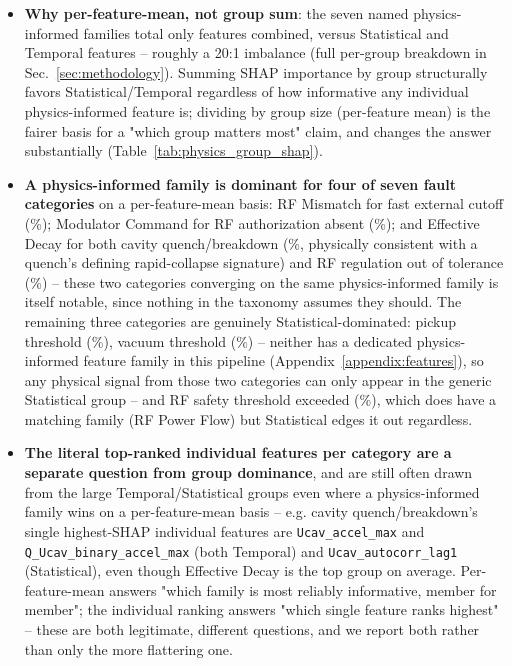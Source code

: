 \begin{itemize}
    \item \textbf{Why per-feature-mean, not group sum}: the seven named physics-informed families total only \MetricOneZeroPhysicsGroupShapNFeaturesPhysicsInformedTotal{} features combined, versus \MetricOneZeroPhysicsGroupShapNFeaturesStatistical{} Statistical and \MetricOneZeroPhysicsGroupShapNFeaturesTemporal{} Temporal features -- roughly a 20:1 imbalance (full per-group breakdown in Sec.~\ref{sec:methodology}). %
Summing SHAP importance by group structurally favors Statistical/Temporal regardless of how informative any individual physics-informed feature is; dividing by group size (per-feature mean) is the fairer basis for a "which group matters most" claim, and changes the answer substantially (Table~\ref{tab:physics_group_shap}).
    \item \textbf{A physics-informed family is dominant for four of seven fault categories} on a per-feature-mean basis: RF Mismatch for fast external cutoff (\MetricOneZeroPhysicsGroupShapFastExternalCutoffTopGroupMeanPct\%); Modulator Command for RF authorization absent (\MetricOneZeroPhysicsGroupShapRfAuthorizationAbsentTopGroupMeanPct\%); and Effective Decay for both cavity quench/breakdown (\MetricOneZeroPhysicsGroupShapCavityQuenchBreakdownTopGroupMeanPct\%, physically consistent with a quench's defining rapid-collapse signature) and RF regulation out of tolerance (\MetricOneZeroPhysicsGroupShapRfRegulationOutOfToleranceTopGroupMeanPct\%) -- these two categories converging on the same physics-informed family is itself notable, since nothing in the taxonomy assumes they should. The remaining three categories are genuinely Statistical-dominated: pickup threshold (\MetricOneZeroPhysicsGroupShapPickupThresholdTopGroupMeanPct\%), vacuum threshold (\MetricOneZeroPhysicsGroupShapVacuumThresholdTopGroupMeanPct\%) -- neither has a dedicated physics-informed feature family in this pipeline (Appendix~\ref{appendix:features}), so any physical signal from those two categories can only appear in the generic Statistical group -- and RF safety threshold exceeded (\MetricOneZeroPhysicsGroupShapRfSafetyThresholdExceededTopGroupMeanPct\%), which does have a matching family (RF Power Flow) but Statistical edges it out regardless.
    \item \textbf{The literal top-ranked individual features per category are a separate question from group dominance}, and are still often drawn from the large Temporal/Statistical groups even where a physics-informed family wins on a per-feature-mean basis -- e.g. cavity quench/breakdown's single highest-SHAP individual features are \texttt{Ucav\_accel\_max} and \texttt{Q\_Ucav\_binary\_accel\_max} (both Temporal) and \texttt{Ucav\_autocorr\_lag1} (Statistical), even though Effective Decay is the top group on average. Per-feature-mean answers "which family is most reliably informative, member for member"; the individual ranking answers "which single feature ranks highest" -- these are both legitimate, different questions, and we report both rather than only the more flattering one.
\end{itemize}

